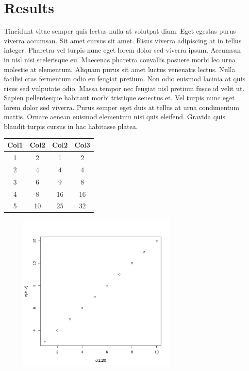 \documentclass[12pt, letterpaper]{article}
\begin{document}
\section{Results}
\label{sec:results}

Tincidunt vitae semper quis lectus nulla at volutpat diam. Eget egestas purus 
viverra accumsan. Sit amet cursus sit amet. Risus viverra adipiscing at in 
tellus integer. Pharetra vel turpis nunc eget lorem dolor sed viverra ipsum. 
Accumsan in nisl nisi scelerisque eu. Maecenas pharetra convallis posuere morbi 
leo urna molestie at elementum. Aliquam purus sit amet luctus venenatis lectus. 
Nulla facilisi cras fermentum odio eu feugiat pretium. Non odio euismod lacinia 
at quis risus sed vulputate odio. Massa tempor nec feugiat nisl pretium fusce id 
velit ut. Sapien pellentesque habitant morbi tristique senectus et. Vel turpis 
nunc eget lorem dolor sed viverra. Purus semper eget duis at tellus at urna 
condimentum mattis. Ornare aenean euismod elementum nisi quis eleifend. Gravida 
quis blandit turpis cursus in hac habitasse platea.

\begin{center}
\label{tab:cooltable}
\begin{tabular}{||c c c c||} 
 \hline
 Col1 & Col2 & Col2 & Col3 \\ [0.5ex] 
 \hline\hline
 1 & 2 & 1 & 2 \\ 
 \hline
 2 & 4 & 4 & 4 \\
 \hline
 3 & 6 & 9 & 8 \\
 \hline
 4 & 8 & 16 & 16 \\
 \hline
 5 & 10 & 25 & 32 \\ [1ex] 
 \hline
\end{tabular}
\end{center}

\begin{figure}[t]
\label{fig:coolfig}
\includegraphics[width=8cm]{fig}
\centering
\end{figure}
\end{document}
